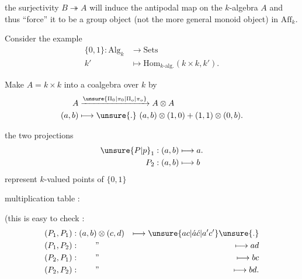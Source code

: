 
the surjectivity $B\twoheadrightarrow A$ will induce the antipodal map on the $k$-algebra $A$ and thus ``force'' it to be a group object (not the more general monoid object) in $\mathrm{Aff}_k$.

Consider the example
\[
\begin{aligned}
\{0,1\}: \mathrm{Alg}_k&\longrightarrow\mathrm{Sets}\\
k'&\longmapsto\mathrm{Hom}_{k\text{-alg}.}(k\times k,k').
\end{aligned}
\]

Make $A=k\times k$ into a coalgebra over $k$ by
\[
\begin{aligned}
 A&\xrightarrow{\unsure{\Pi_0|\pi_0|\Pi_o|\pi_o}}A\otimes A\\
 (a,b)&\longmapsto\unsure{.}\ (a,b)\otimes(1,0)+(1,1)\otimes(0,b).
\end{aligned}
\]

the two projections
\[
\begin{aligned}
\unsure{P|p}_1 &: (a,b)\longmapsto a.\\
P_2 &: (a,b)\longmapsto b
\end{aligned}
\]
represent $k$-valued points of $\{0,1\}$

multiplication table :

(this is easy to check :
\[
\begin{aligned}
(P_1,P_1)&:(a,b)\otimes(c,d)&\longmapsto\unsure{ac|\acute a\acute c|a'c'}\unsure{.}\\
(P_1,P_2)&:\qquad\text{\rq\rq}&\longmapsto ad\\
(P_2,P_1)&:\qquad\text{\rq\rq}&\longmapsto bc\\
(P_2,P_2)&:\qquad\text{\rq\rq}&\longmapsto bd.
\end{aligned}
\]
\clearpage
